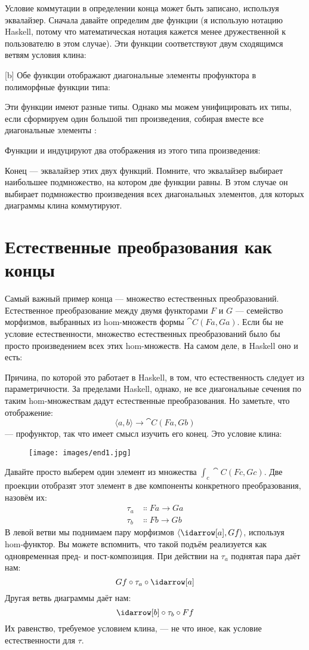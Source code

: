 Условие коммутации в определении конца может быть записано,
используя эквалайзер. Сначала давайте определим две функции (я использую нотацию
Haskell, потому что математическая нотация кажется менее дружественной к пользователю
в этом случае). Эти функции соответствуют двум сходящимся ветвям
условия клина:

[b]
Обе функции отображают диагональные элементы профунктора  в
полиморфные функции типа:

Эти функции имеют разные типы. Однако мы можем унифицировать их типы,
если сформируем один большой тип произведения, собирая вместе все диагональные
элементы :

Функции  и  индуцируют два отображения из
этого типа произведения:

Конец  --- эквалайзер этих двух функций. Помните,
что эквалайзер выбирает наибольшее подмножество, на котором две функции
равны. В этом случае он выбирает подмножество произведения всех диагональных
элементов, для которых диаграммы клина коммутируют.

\section{Естественные преобразования как концы}

Самый важный пример конца --- множество естественных
преобразований. Естественное преобразование между двумя функторами
$F$ и $G$ --- семейство морфизмов, выбранных из hom-множеств
формы $\cat{C}(F a, G a)$. Если бы не условие естественности,
множество естественных преобразований было бы просто произведением
всех этих hom-множеств. На самом деле, в Haskell оно и есть:

Причина, по которой это работает в Haskell, в том, что естественность следует из
параметричности. За пределами Haskell, однако, не все диагональные сечения
по таким hom-множествам дадут естественные преобразования. Но заметьте, что
отображение:
\[\langle a, b \rangle \to \cat{C}(F a, G b)\]
--- профунктор, так что имеет смысл изучить его конец. Это условие
клина:

\begin{figure}[H]
  \centering
  \texttt{[image: images/end1.jpg]}
\end{figure}

\noindent
Давайте просто выберем один элемент из множества $\int_c \cat{C}(F c, G c)$.
Две проекции отобразят этот элемент в две компоненты
конкретного преобразования, назовём их:
\begin{align*}
  \tau_a & \Colon F a \to G a \\
  \tau_b & \Colon F b \to G b
\end{align*}
В левой ветви мы поднимаем пару морфизмов
$\langle \idarrow[a], G f \rangle$, используя hom-функтор. Вы
можете вспомнить, что такой подъём реализуется как одновременная пред- и
пост-композиция. При действии на $\tau_a$ поднятая пара даёт нам:
\[G f \circ \tau_a \circ \idarrow[a]\]
Другая ветвь диаграммы даёт нам:
\[\idarrow[b] \circ \tau_b \circ F f\]
Их равенство, требуемое условием клина, --- не что иное, как
условие естественности для $\tau$.

